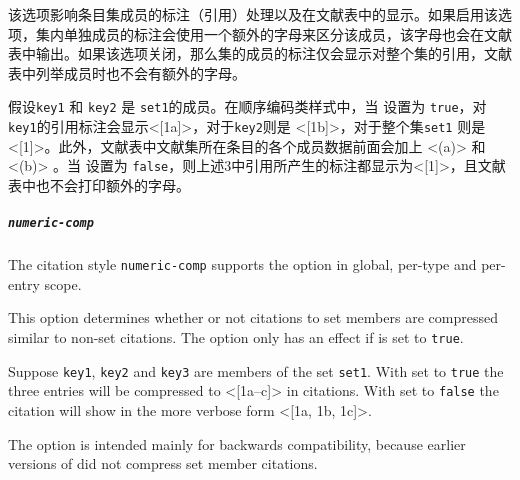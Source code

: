 \begin{optionlist}



该选项影响条目集成员的标注（引用）处理以及在文献表中的显示。如果启用该选项，集内单独成员的标注会使用一个额外的字母来区分该成员，该字母也会在文献表中输出。如果该选项关闭，那么集的成员的标注仅会显示对整个集的引用，文献表中列举成员时也不会有额外的字母。


假设\texttt{key1} 和 \texttt{key2} 是 \texttt{set1}的成员。在顺序编码类样式中，当 设置为 \texttt{true}，对\texttt{key1}的引用标注会显示<[1a]>，对于\texttt{key2}则是 <[1b]>，对于整个集\texttt{set1} 则是<[1]>。此外，文献表中文献集所在条目的各个成员数据前面会加上 <(a)> 和 <(b)> 。当 设置为 \texttt{false}，则上述3中引用所产生的标注都显示为<[1]>，且文献表中也不会打印额外的字母。

\end{optionlist}

\subparagraph{\texttt{numeric-comp}} The citation style \texttt{numeric-comp}  supports the  option in global, per-type and per-entry scope.

\begin{optionlist}


This option determines whether or not citations to set members are compressed similar to non-set citations. The option only has an effect if  is set to \texttt{true}.

Suppose \texttt{key1}, \texttt{key2} and \texttt{key3} are members of the set \texttt{set1}. With  set to \texttt{true} the three entries will be compressed to <[1a--c]> in citations. With  set to \texttt{false} the citation will show in the more verbose form <[1a, 1b, 1c]>.

The option is intended mainly for backwards compatibility, because earlier versions of \biblatex did not compress set member citations.

\end{optionlist}

